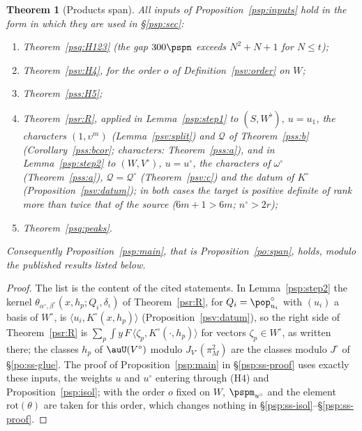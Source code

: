 \documentclass[10pt]{amsart}
\newtheorem{theorem}{Theorem}[section]
\theoremstyle{definition}
\theoremstyle{remark}
\begin{document}
\begin{theorem}[Products span]\label{psv:main}
All inputs of Proposition~\ref{psp:inputs} hold in the form in which they are used in \S\ref{psp:sec}:
\begin{enumerate}
\item[(H1)--(H3)] Theorem~\ref{psq:H123} \textup(the gap $300\pspn$ exceeds $N^2+N+1$ for $N\le t$\textup);
\item[(H4)] Theorem~\ref{psv:H4}, for the order $o$ of Definition~\ref{psv:order} on $W$;
\item[(H5)] Theorem~\ref{pss:H5};
\item[(R)] Theorem~\ref{psr:R}, applied in Lemma~\ref{psp:step1} to $(S,W^\flat)$, $u=u_1$, the characters
$(1,\upsilon^m)$ \textup(Lemma~\ref{psv:split}\textup) and $\mathcal Q$ of Theorem~\ref{pss:b} \textup(Corollary~\ref{pss:bcor};
characters: Theorem~\ref{pss:a}\textup), and in Lemma~\ref{psp:step2} to $(W,V^\circ)$, $u=u^\circ$, the characters of
$\omega^\circ$ \textup(Theorem~\ref{pss:a}\textup), $\mathcal Q=\mathcal Q^\circ$ \textup(Theorem~\ref{psv:c}\textup) and the datum of
$K^\circ$ \textup(Proposition~\ref{psv:datum}\textup); in both cases the target is positive definite of rank more than
twice that of the source ($6m+1>6m$; $n^\circ>2r$);
\item[(P)] Theorem~\ref{psq:peaks}.
\end{enumerate}
Consequently Proposition~\ref{psp:main}, that is Proposition~\ref{po:span}, holds, modulo the published results
listed below.
\end{theorem}
\begin{proof}
The list is the content of the cited statements. In Lemma~\ref{psp:step2} the kernel $\theta_{\alpha^\circ,\beta^\circ}(x,h_p;Q_i,
\delta_\iota)$ of Theorem~\ref{psr:R}, for $Q_i=\pop^\circ_{u_i}$ with $(u_i)$ a basis of $W^\circ$, is
$\langle u_i,K^\circ(x,h_p)\rangle$ (Proposition~\ref{psv:datum}), so the right side of Theorem~\ref{psr:R} is
$\sum_p\int y\,F\,\langle\zeta_p,K^\circ(\cdot,h_p)\rangle$ for vectors $\zeta_p\in W^\circ$, as written there; the classes
$h_p$ of $\auU(V^\circ)$ modulo $J_{V^\circ}(\pi_M^2)$ are the classes modulo $J^\circ$ of \S\ref{po:ss-glue}. The proof
of Proposition~\ref{psp:main} in \S\ref{psp:ss-proof} uses exactly these inputs, the weights $u$ and $u^\circ$
entering through (H4) and Proposition~\ref{psp:isol}; with the order $o$ fixed on $W$, $\pspm_{u^\circ}$ and the
element $\mathrm{rot}(\theta)$ are taken for this order, which changes nothing in \S\ref{psp:ss-isol}--\S\ref{psp:ss-proof}.
\end{proof}
\end{document}
